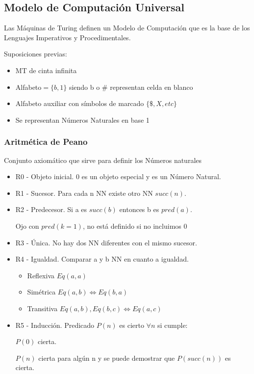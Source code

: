 \subsection{Modelo de Computación Universal}
Las Máquinas de Turing definen un Modelo de Computación que es la base de los Lenguajes Imperativos y Procedimentales.
\pagebreak

Suposiciones previas:
\begin{itemize}
    \item MT de cinta infinita
    \item Alfabeto$=\{b,1\}$ siendo b o $\#$ representan celda en blanco
    \item Alfabeto auxiliar con símbolos de marcado $\{\$, X, etc\}$
    \item Se representan Números Naturales en base 1
\end{itemize}

\subsubsection{Aritmética de Peano} 
Conjunto axiomático que sirve para definir los Números naturales
\begin{itemize}
    \item R0 - Objeto inicial. 0 es un objeto especial y es un Número Natural.
    \item R1 - Sucesor. Para cada n NN existe otro NN $succ(n)$.
    \item R2 - Predecesor. Si a es $succ(b)$ entonces b es $pred(a)$.
    
    Ojo con $pred(k=1)$, no está definido si no incluimos 0
    \item R3 - Única. No hay dos NN diferentes con el mismo sucesor.
    \item R4 - Igualdad. Comparar a y b NN en cuanto a igualdad.
    \begin{itemize}
        \item Reflexiva $Eq(a,a)$
        \item Simétrica $Eq(a,b) \Leftrightarrow Eq(b,a)$
        \item Transitiva $Eq(a,b), Eq(b,c) \Leftrightarrow Eq(a,c)$
    \end{itemize}
    \item R5 - Inducción. Predicado $P(n)$ es cierto $\forall n$ si cumple: 
    
    $P(0)$ cierta.
    
    $P(n)$ cierta para algún n y se puede demostrar que $P(succ(n))$ es cierta.
\end{itemize}

